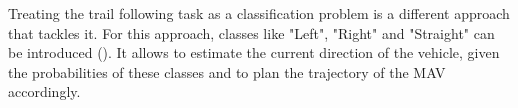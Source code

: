 Treating the trail following task as a classification problem is a different approach that tackles it. For this approach, classes like "Left", "Right" and "Straight" can be introduced \cite{giusti2016machine} (). It allows to estimate the current direction of the vehicle, given the probabilities of these classes and to plan the trajectory of the \acs{MAV} accordingly. 


\begin{figure}[!h]
  \begin{minipage}{.5\linewidth}
  \centering
  \end{minipage}
  \begin{minipage}{.5\linewidth}
  \centering	
  


\end{minipage}
\end{figure}
